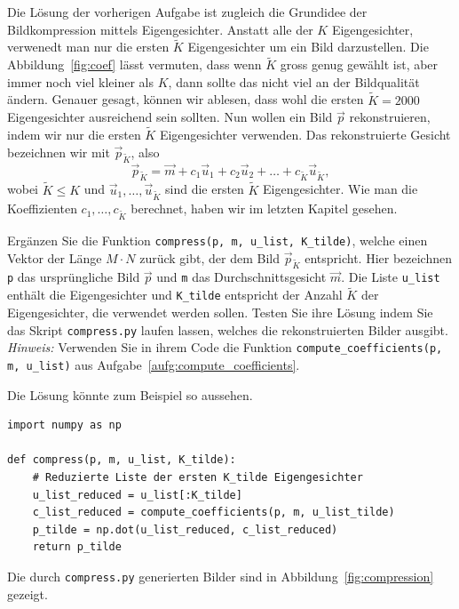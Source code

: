 Die Lösung der vorherigen Aufgabe ist zugleich die Grundidee der Bildkompression mittels Eigengesichter.
Anstatt alle der $K$ Eigengesichter, verwenedt man nur die ersten $\tilde K$ Eigengesichter um ein Bild darzustellen.
Die Abbildung~\ref{fig:coef} lässt vermuten, dass wenn $\tilde K$ gross genug gewählt ist, aber immer noch viel kleiner als $K$, dann sollte das nicht viel an der Bildqualität ändern.
Genauer gesagt, können wir ablesen, dass wohl die ersten $\tilde K=2000$ Eigengesichter ausreichend sein sollten.
Nun wollen ein Bild $\vec p$ rekonstruieren, indem wir nur die ersten $\tilde K$ Eigengesichter verwenden.
Das rekonstruierte Gesicht bezeichnen wir mit $\vec p_{\tilde K}$, also
\begin{equation*}
	\vec p_{\tilde K}=\vec m+c_1\vec u_1+c_2\vec u_2+\ldots+c_{\tilde K}\vec u_{\tilde K},
\end{equation*}
wobei $\tilde K\leq K$ und $\vec u_1,\ldots,\vec u_{\tilde K}$ sind die ersten $\tilde K$ Eigengesichter.
Wie man die Koeffizienten $c_1,\ldots,c_{\tilde K}$ berechnet, haben wir im letzten Kapitel gesehen.
\begin{aufgabe}
	Ergänzen Sie die Funktion \texttt{compress(p, m, u\_list, K\_tilde)}, welche einen Vektor der Länge $M\cdot N$ zurück gibt, der dem Bild $\vec p_{\tilde K}$ entspricht.
	Hier bezeichnen \texttt{p} das ursprüngliche Bild $\vec p$ und \texttt{m} das Durchschnittsgesicht $\vec m$.
	Die Liste \texttt{u\_list} enthält die Eigengesichter und \texttt{K\_tilde} entspricht der Anzahl $\tilde K$ der Eigengesichter, die verwendet werden sollen.
	Testen Sie ihre Lösung indem Sie das Skript \texttt{compress.py} laufen lassen, welches die rekonstruierten Bilder ausgibt.
	\textit{Hinweis:} Verwenden Sie in ihrem Code die Funktion \texttt{compute\_coefficients(p, m, u\_list)} aus Aufgabe~\ref{aufg:compute_coefficients}.
\end{aufgabe}
\begin{losung*}
	Die Lösung könnte zum Beispiel so aussehen.
\begin{lstlisting}[style=python]
import numpy as np

def compress(p, m, u_list, K_tilde):
	# Reduzierte Liste der ersten K_tilde Eigengesichter
	u_list_reduced = u_list[:K_tilde]
	c_list_reduced = compute_coefficients(p, m, u_list_tilde)
	p_tilde = np.dot(u_list_reduced, c_list_reduced)
	return p_tilde
\end{lstlisting}
Die durch \texttt{compress.py} generierten Bilder sind in Abbildung~\ref{fig:compression} gezeigt.
\end{losung*}
